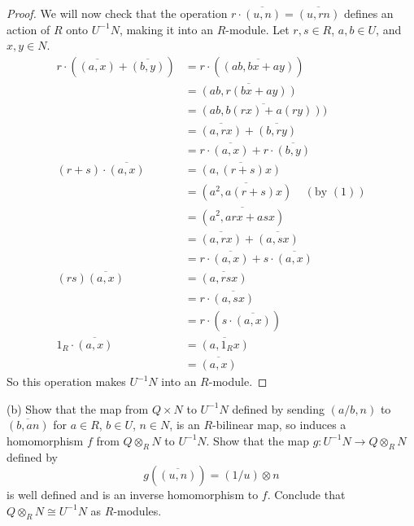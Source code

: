 \documentclass[10pt]{article}
\renewcommand{\bar}{\overline}
\begin{document}
\begin{enumerate}
\begin{proof}
We will now check that the operation $r \cdot \bar{(u,n)} = \bar{(u,rn)}$ defines an action of $R$ onto $U^{-1}N$, making it into an $R$-module.  Let $r,s \in R$, $a,b \in U$, and $x,y \in N$.
\begin{align*}
r\cdot (\bar{(a,x)} + \bar{(b,y)}) &= r \cdot (\bar{(ab, bx + ay)})
\\
&=\bar{(ab,r(bx + ay))}
\\
&=\bar{(ab,b(rx) + a(ry)))}
\\
&= \bar{(a,rx)} + \bar{(b,ry)}
\\
&= r\cdot \bar{(a,x)} + r\cdot \bar{(b,y)}
\\
(r+s) \cdot \bar{(a,x)} &= \bar{(a,(r+s)x)}
\\
&= \bar{(a^2,a(r+s)x)} \ \ \ \ \ (\text{by } (1))
\\
&= \bar{(a^2, arx + asx)}
\\
&= \bar{(a,rx)} + \bar{(a,sx)}
\\
&= r \cdot \bar{(a,x)} + s\cdot \bar{(a,x)}
\\
(rs)\bar{(a,x)} &= \bar{(a,rsx)}
\\
&= r \cdot \bar{(a,sx)}
\\
&= r\cdot (s\cdot \bar{(a,x)})
\\
1_R \cdot \bar{(a,x)} &= \bar{(a,1_Rx)}
\\
&= \bar{(a,x)}
\end{align*}
So this operation makes $U^{-1}N$ into an $R$-module.
\end{proof}

(b) Show that the map from $Q \times N$ to $U^{-1}N$ defined by sending $(a/b,n)$ to $\overline{(b,an)}$ for $a \in R$, $b \in U$, $n \in N$, is an $R$-bilinear map, so induces a homomorphism $f$ from $Q \otimes_R N$ to $U^{-1}N$.  Show that the map $g: U^{-1}N \rightarrow Q \otimes_R N$ defined by
\[
g(\overline{(u,n)}) = (1/u) \otimes n
\]
is well defined and is an inverse homomorphism to $f$.  Conclude that $Q \otimes_R N \cong U^{-1}N$ as $R$-modules.


\end{enumerate}
\end{document}
